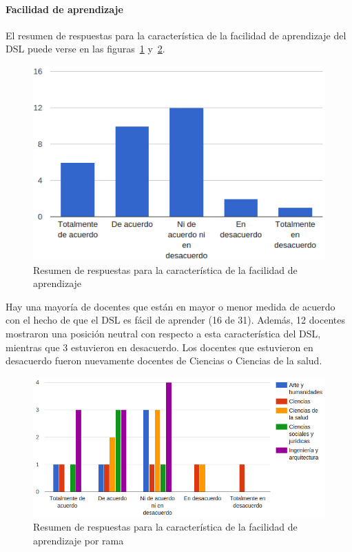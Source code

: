 \newpage
\paragraph*{Facilidad de aprendizaje}

El resumen de respuestas para la característica de la facilidad de aprendizaje del DSL puede verse en las figuras~\ref{fig:evalmetodo:dsl:aprendizaje} y~\ref{fig:evalmetodo:dsl:aprendizaje:rama}.

\begin{figure}[h]
  \begin{center}
    \includegraphics[scale=0.45]{C_DSL_aprendizaje.png}
  \end{center}
  \caption{Resumen de respuestas para la característica de la facilidad de aprendizaje}
  \label{fig:evalmetodo:dsl:aprendizaje}
\end{figure}

Hay una mayoría de docentes que están en mayor o menor medida de acuerdo con el hecho de que el DSL es fácil de aprender (16 de 31). Además, 12 docentes mostraron una posición neutral con respecto a esta característica del DSL, mientras que 3 estuvieron en desacuerdo. Los docentes que estuvieron en desacuerdo fueron nuevamente docentes de Ciencias o Ciencias de la salud.

\begin{figure}[h]
  \begin{center}
    \includegraphics[scale=0.40]{C_DSL_aprendizaje_rama.png}
  \end{center}
  \caption{Resumen de respuestas para la característica de la facilidad de aprendizaje por rama}
  \label{fig:evalmetodo:dsl:aprendizaje:rama}
\end{figure}

